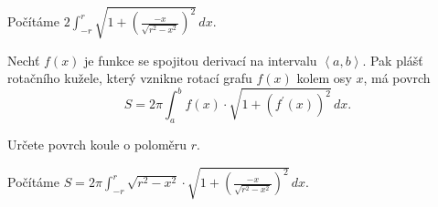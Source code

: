 \begin{reseni}
Počítáme $2\int _{-r}^r \sqrt{1+\left ( \frac{-x}{\sqrt{r^2-x^2}} \right )^2 }\, dx.  $
\end{reseni}

\begin{pozn}
    Nechť $f(x)$ je funkce se spojitou derivací na intervalu $\left < a,b \right > .$
    Pak plášť rotačního kužele, který vznikne rotací grafu $f(x)$ kolem osy $x$, má
   povrch
  $$S=2\pi\int_a^b f(x)\cdot \sqrt{1+(f^\prime(x))^2}\, dx. $$
\end{pozn}

\begin{priklad}
Určete povrch koule o poloměru $r$.
\end{priklad}

\begin{reseni}
Počítáme $S=2\pi\int_{-r}^r \sqrt{r^2-x^2}\cdot \sqrt{1+\left ( \frac{-x}{\sqrt{r^2-x^2} } \right )^2 } \, dx. $
\end{reseni}
